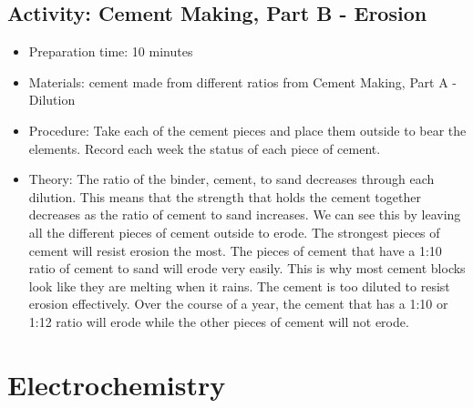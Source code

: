 \begin{itemize}
{\begin{itemize}
\subsection{Activity: Cement Making, Part B - Erosion}
\begin{itemize}
\item{Preparation time: 10 minutes}
\item{Materials: cement made from different ratios from Cement Making, Part A - Dilution}
\item{Procedure: Take each of the cement pieces and place them outside to bear the elements. Record each week the status of each piece of cement.}
\item{Theory: The ratio of the binder, cement, to sand decreases through each dilution. This means that the strength that holds the cement together decreases as the ratio of cement to sand increases. We can see this by leaving all the different pieces of cement outside to erode. The strongest pieces of cement will resist erosion the most. The pieces of cement that have a 1:10 ratio of cement to sand will erode very easily. This is why most cement blocks look like they are melting when it rains. The cement is too diluted to resist erosion effectively. Over the course of a year, the cement that has a 1:10 or 1:12 ratio will erode while the other pieces of cement will not erode.}
\end{itemize}

\section{Electrochemistry}


\end{itemize}}
\end{itemize}
